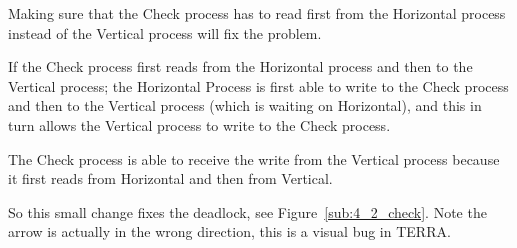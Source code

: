 \documentclass[a4paper,twoside,11pt]{article}
\begin{document}
Making sure that the Check process has to read first from the Horizontal process 
instead of the Vertical process will fix the problem.

If the Check process first reads from the Horizontal process and then to the Vertical
process; the Horizontal Process is first able to write to the Check process and 
then to the Vertical process 
(which is waiting on Horizontal), and this in turn allows the Vertical process to write to the Check process.

The Check process is able to receive the write from the Vertical process because it first reads from Horizontal and then from Vertical.

\smallskip
So this small change fixes the deadlock, see Figure~\ref{sub:4_2_check}.
Note the arrow is actually in the wrong direction, this is a visual bug in TERRA.
\end{document}
